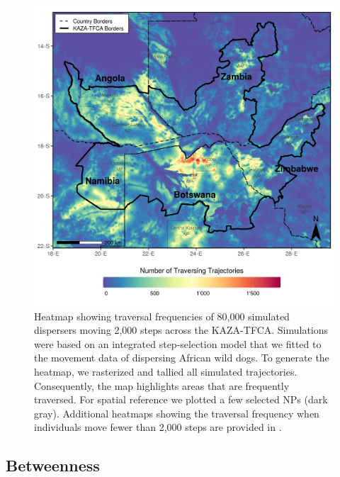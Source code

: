 \documentclass[../FinalThesis.tex]{subfiles}
\begin{document}
\begin{figure}[htpb]
  \includegraphics[width=\textwidth]{Figures/Heatmap.png}
  \caption{Heatmap showing traversal frequencies of 80,000 simulated dispersers
  moving 2,000 steps across the KAZA-TFCA. Simulations were based on an
  integrated step-selection model that we fitted to the movement data of
  dispersing African wild dogs. To generate the heatmap, we rasterized and
  tallied all simulated trajectories. Consequently, the map highlights areas
  that are frequently traversed. For spatial reference we plotted a few selected
  NPs (dark gray). Additional heatmaps showing the traversal frequency when
  individuals move fewer than 2,000 steps are provided in
  .}
  \label{Heatmap}
\end{figure}

\subsection{Betweenness}
\end{document}

